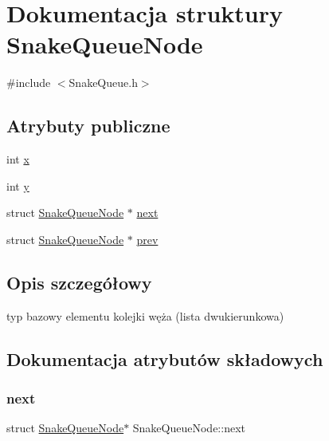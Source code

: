 \hypertarget{struct_snake_queue_node}{}\section{Dokumentacja struktury Snake\+Queue\+Node}
\label{struct_snake_queue_node}


{\ttfamily \#include $<$Snake\+Queue.\+h$>$}

\subsection*{Atrybuty publiczne}
\begin{DoxyCompactItemize}
\item 
int \mbox{\hyperlink{struct_snake_queue_node_ad1a354fa473ef2024c04198732c70da2}{x}}
\item 
int \mbox{\hyperlink{struct_snake_queue_node_a381b33b6f6e38e1e33c6c7fd4e1e40aa}{y}}
\item 
struct \mbox{\hyperlink{struct_snake_queue_node}{Snake\+Queue\+Node}} $\ast$ \mbox{\hyperlink{struct_snake_queue_node_a59b4d253712aa9845911e35f4def5b77}{next}}
\item 
struct \mbox{\hyperlink{struct_snake_queue_node}{Snake\+Queue\+Node}} $\ast$ \mbox{\hyperlink{struct_snake_queue_node_a82d23b0c0ebc4b94722733faf8f84297}{prev}}
\end{DoxyCompactItemize}


\subsection{Opis szczegółowy}
typ bazowy elementu kolejki węża (lista dwukierunkowa) 

\subsection{Dokumentacja atrybutów składowych}
\mbox{\label{struct_snake_queue_node_a59b4d253712aa9845911e35f4def5b77}} 
\subsubsection{\texorpdfstring{next}{next}}
{\footnotesize\ttfamily struct \mbox{\hyperlink{struct_snake_queue_node}{Snake\+Queue\+Node}}$\ast$ Snake\+Queue\+Node\+::next}

